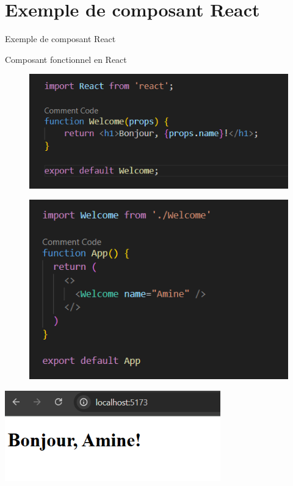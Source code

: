 \documentclass{clbeamer2024}
\begin{document}
	\section{Exemple de composant React}
	\begin{frame}{Exemple de composant React}
		\begin{exampleblock}{Composant fonctionnel en React}
			\begin{figure}[h] %
				\centering
				\begin{minipage}{0.45\textwidth}
					\centering
					\includegraphics[width=\linewidth]{images/code1.png}
					\label{fig:image1}
				\end{minipage}
				\hfill %
				\begin{minipage}{0.38\textwidth}
					\centering
					\includegraphics[width=\linewidth]{images/code2.png}
					\label{fig:image2}
				\end{minipage}
			\end{figure}
			\centering
			\includegraphics[width=0.7\textwidth]{images/resultat1.png}
		\end{exampleblock}
	\end{frame}
	
\end{document}
